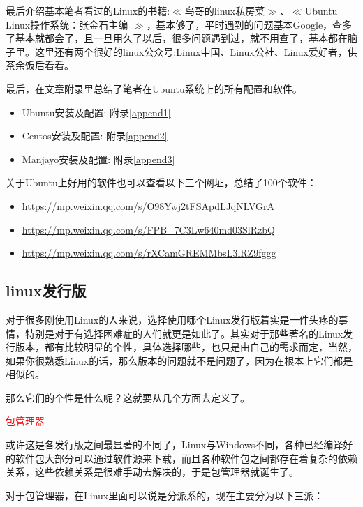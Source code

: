 \documentclass[utf8]{book}
\begin{document}
	最后介绍基本笔者看过的Linux的书籍:$\ll$鸟哥的linux私房菜$\gg$、$\ll$Ubuntu Linux操作系统：张金石主编 $\gg$，基本够了，平时遇到的问题基本Google，查多了基本就都会了，且一旦用久了以后，很多问题遇到过，就不用查了，基本都在脑子里。这里还有两个很好的linux公众号:Linux中国、Linux公社、Linux爱好者，供茶余饭后看看。
	
	最后，在文章附录里总结了笔者在Ubuntu系统上的所有配置和软件。
	
	\begin{itemize}
		\item Ubuntu安装及配置: 附录\ref{append1}
		\item Centos安装及配置: 附录\ref{append2}
		\item Manjayo安装及配置: 附录\ref{append3}
	\end{itemize}
	
	关于Ubuntu上好用的软件也可以查看以下三个网址，总结了100个软件：
	
	\begin{itemize}
		\item \url{https://mp.weixin.qq.com/s/O98Ywj2tFSApdLJqNLVGrA}
		\item \url{https://mp.weixin.qq.com/s/FPB_7C3Lw640md03SlRzbQ}
		\item \url{https://mp.weixin.qq.com/s/rXCamGREMMbsL3lRZ9fggg}
	\end{itemize}
	
	\subsection{linux发行版}
	对于很多刚使用Linux的人来说，选择使用哪个Linux发行版着实是一件头疼的事情，特别是对于有选择困难症的人们就更是如此了。其实对于那些著名的Linux发行版本，都有比较明显的个性，具体选择哪些，也只是由自己的需求而定，当然，如果你很熟悉Linux的话，那么版本的问题就不是问题了，因为在根本上它们都是相似的。

	那么它们的个性是什么呢？这就要从几个方面去定义了。


	\begin{center}
	{\LARGE \textcolor{red}{包管理器}}
	\end{center}

	 或许这是各发行版之间最显著的不同了，Linux与Windows不同，各种已经编译好的软件包大部分可以通过软件源来下载，而且各种软件包之间都存在着复杂的依赖关系，这些依赖关系是很难手动去解决的，于是包管理器就诞生了。

	对于包管理器，在Linux里面可以说是分派系的，现在主要分为以下三派：
\end{document}
